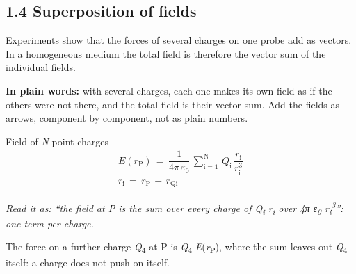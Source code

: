 \documentclass[11pt]{article}
\begin{document}
\begin{keepsection}
\section{1.4 Superposition of fields}

Experiments show that the forces of several charges on one probe add as vectors. In a homogeneous medium the total field is therefore the vector sum of the individual fields.

\begin{plainbox}\textbf{In plain words:} with several charges, each one makes its own field as if the others were not there, and the total field is their vector sum. Add the fields as arrows, component by component, not as plain numbers.\end{plainbox}

\begin{equationcard}{Field of \textit{N} point charges}
\[ \begin{gathered} {E}({r}_{\mathrm{P}})\, =\, \dfrac{1}{4π\, ε_{0}}\, \sum_{\mathrm{i}=1}^{\mathrm{N}} \, {Q}_{\mathrm{i}}\, \dfrac{{r}_{\mathrm{i}}}{{r}_{\mathrm{i}}^{3}} \\ {r}_{\mathrm{i}}\, =\, {r}_{\mathrm{P}}\, -\, {r}_{\text{Qi}} \end{gathered} \]
{\small \emph{Read it as: “the field at P is the sum over every charge of Q\textsubscript{i} r\textsubscript{i} over 4π ε\textsubscript{0} r\textsubscript{i}\textsuperscript{3}”: one term per charge.}\par The force on a further charge \textit{Q}\textsubscript{4} at P is \textit{Q}\textsubscript{4} \textit{E}(\textit{r}\textsubscript{P}), where the sum leaves out \textit{Q}\textsubscript{4} itself: a charge does not push on itself.}
\end{equationcard}


\end{keepsection}
\end{document}
